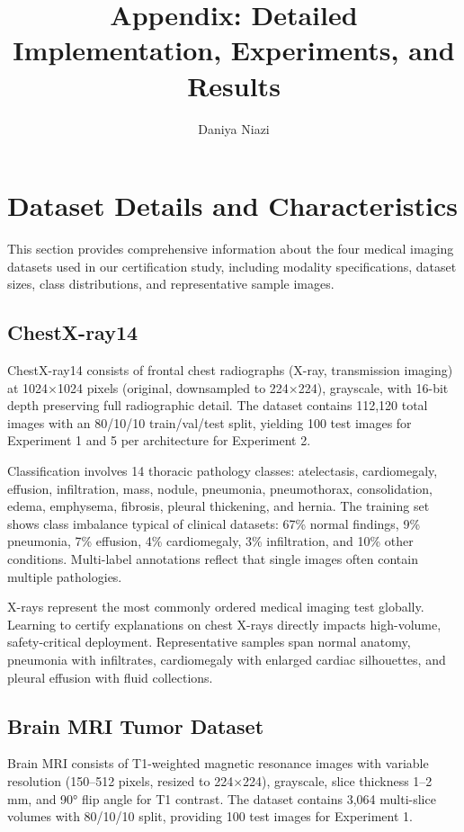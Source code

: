 \documentclass[11pt]{article}
\title{Appendix: Detailed Implementation, Experiments, and Results}
\author{Daniya Niazi}
\date{}
\begin{document}
\maketitle
\tableofcontents

\newpage

\section{Dataset Details and Characteristics}

This section provides comprehensive information about the four medical imaging datasets used in our certification study, including modality specifications, dataset sizes, class distributions, and representative sample images.

\subsection{ChestX-ray14}

ChestX-ray14 consists of frontal chest radiographs (X-ray, transmission imaging) at 1024×1024 pixels (original, downsampled to 224×224), grayscale, with 16-bit depth preserving full radiographic detail. The dataset contains 112,120 total images with an 80/10/10 train/val/test split, yielding 100 test images for Experiment 1 and 5 per architecture for Experiment 2.

Classification involves 14 thoracic pathology classes: atelectasis, cardiomegaly, effusion, infiltration, mass, nodule, pneumonia, pneumothorax, consolidation, edema, emphysema, fibrosis, pleural thickening, and hernia. The training set shows class imbalance typical of clinical datasets: 67\% normal findings, 9\% pneumonia, 7\% effusion, 4\% cardiomegaly, 3\% infiltration, and 10\% other conditions. Multi-label annotations reflect that single images often contain multiple pathologies.

X-rays represent the most commonly ordered medical imaging test globally. Learning to certify explanations on chest X-rays directly impacts high-volume, safety-critical deployment. Representative samples span normal anatomy, pneumonia with infiltrates, cardiomegaly with enlarged cardiac silhouettes, and pleural effusion with fluid collections.

\subsection{Brain MRI Tumor Dataset}

Brain MRI consists of T1-weighted magnetic resonance images with variable resolution (150–512 pixels, resized to 224×224), grayscale, slice thickness 1–2 mm, and 90° flip angle for T1 contrast. The dataset contains 3,064 multi-slice volumes with 80/10/10 split, providing 100 test images for Experiment 1.
\end{document}

